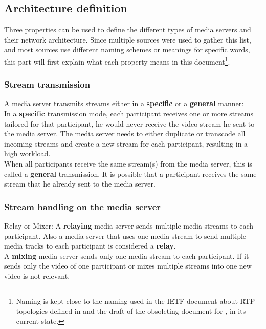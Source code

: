 \documentclass[../../../thesis.tex]{subfiles}
\begin{document}
\subsection{Architecture definition}
Three properties can be used to define the different types of media servers and their network architecture. Since multiple sources were used to gather this list, and most sources use different naming schemes or meanings for specific words, this part will first explain what each property means in this document\footnote{Naming is kept close to the naming used in the IETF document about RTP topologies defined in  and the draft of the obsoleting document for , in its current state\cite{ietf-multipoint-arch}.}.
\par

\subsubsection{Stream transmission}
A media server transmits streams either in a \textbf{specific} or a \textbf{general} manner: \\In a \textbf{specific} transmission mode, each participant receives one or more streams tailored for that participant, he would never receive the video stream he sent to the media server. The media server needs to either duplicate or transcode all incoming streams and create a new stream for each participant, resulting in a high workload.\\
When all participants receive the same stream(s) from the media server, this is called a \textbf{general} transmission. It is possible that a participant receives the same stream that he already sent to the media server.\newline

\subsubsection{Stream handling on the media server}
Relay or Mixer: 
A \textbf{relaying} media server sends multiple media streams to each participant. Also a media server that uses one media stream to send multiple media tracks to each participant is considered a \textbf{relay}.\\
A \textbf{mixing} media server sends only one media stream to each participant. If it sends only the video of one participant or mixes multiple streams into one new video is not relevant.
\end{document}
